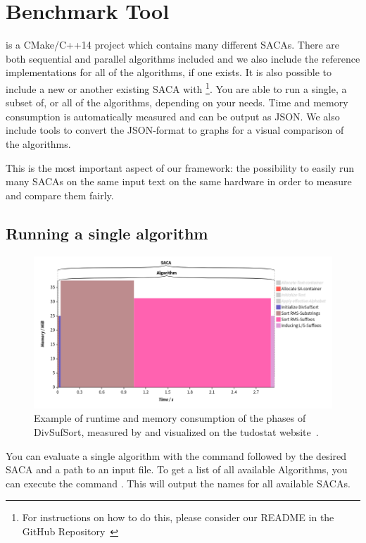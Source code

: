 \section{Benchmark Tool}

\sacabench is a CMake/C++14 project which contains many different SACAs.
There are both sequential and parallel algorithms included
and we also include the reference implementations for all of the algorithms, if one exists.
It is also possible to include a new or another existing SACA with \sacabench
\footnote{For instructions on how to do this, please consider our README in the GitHub Repository~\cite{sacabench:github}}.
You are able to run a single, a subset of, or all of the algorithms, depending on your needs.
Time and memory consumption is automatically measured and can be output as JSON.
We also include tools to convert the JSON-format to graphs for a visual comparison of the algorithms.

This is the most important aspect of our framework:
the possibility to easily run many SACAs on the same input text on the same hardware
in order to measure and compare them fairly.

\subsection{Running a single algorithm}

\begin{figure}[!h]
    \centering
    \includegraphics[width=\textwidth]{kapitel/1_extended_abstract/tudostat_example.png}
    \caption{Example of runtime and memory consumption of the phases of DivSufSort, measured by \sacabench and visualized on the tudostat website~\cite{tudostat}.}
    \label{ea:phases}
\end{figure}

You can evaluate a single algorithm with the command  followed by the desired SACA and a path to an input file.
To get a list of all available Algorithms, you can execute the command .
This will output the names for all available SACAs.

